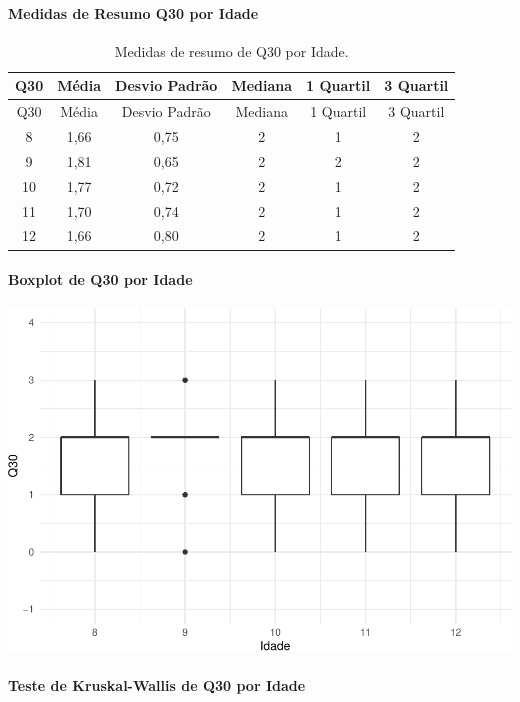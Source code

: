 \documentclass[]{article}
\let\oldparagraph\paragraph
\renewcommand{\paragraph}[1]{\oldparagraph{#1}\mbox{}}
\begin{document}
\cleardoublepage

\hypertarget{medidas-de-resumo-q30-por-idade}{%
\paragraph{Medidas de Resumo Q30 por Idade}\label{medidas-de-resumo-q30-por-idade}}

\begin{longtable}[]{@{}cccccc@{}}
\caption{\label{tab:unnamed-chunk-980}Medidas de resumo de Q30 por Idade.}\tabularnewline
\toprule
Q30 & Média & Desvio Padrão & Mediana & 1 Quartil & 3 Quartil\tabularnewline
\midrule
\endfirsthead
\toprule
Q30 & Média & Desvio Padrão & Mediana & 1 Quartil & 3 Quartil\tabularnewline
\midrule
\endhead
8 & 1,66 & 0,75 & 2 & 1 & 2\tabularnewline
9 & 1,81 & 0,65 & 2 & 2 & 2\tabularnewline
10 & 1,77 & 0,72 & 2 & 1 & 2\tabularnewline
11 & 1,70 & 0,74 & 2 & 1 & 2\tabularnewline
12 & 1,66 & 0,80 & 2 & 1 & 2\tabularnewline
\bottomrule
\end{longtable}

\hypertarget{boxplot-de-q30-por-idade}{%
\paragraph{Boxplot de Q30 por Idade}\label{boxplot-de-q30-por-idade}}

\begin{center}\includegraphics[width=0.75\linewidth]{relatorio_covid19_files/figure-latex/unnamed-chunk-981-1} \end{center}

\hypertarget{teste-de-kruskal-wallis-de-q30-por-idade}{%
\paragraph{Teste de Kruskal-Wallis de Q30 por Idade}\label{teste-de-kruskal-wallis-de-q30-por-idade}}
\end{document}

